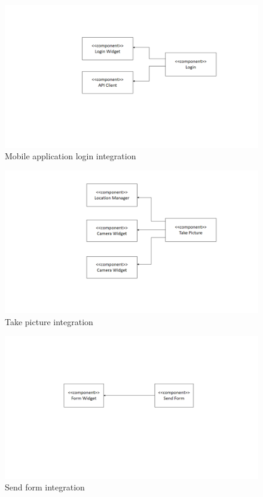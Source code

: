 \begin{figure}[H]
\centering
\includegraphics[width=\textwidth]{Images/LoginIntegration.png}
\caption{\label{fig:LoginIntegration}Mobile application login integration}
\end{figure}

\begin{figure}[H]
\centering
\includegraphics[width=\textwidth]{Images/TakePicIntegration.png}
\caption{\label{fig:TakePicIntegration}Take picture integration}
\end{figure}

\begin{figure}[H]
\centering
\includegraphics[width=\textwidth]{Images/SendForm.png}
\caption{\label{fig:SendFormIntegrationn} Send form integration}
\end{figure}

